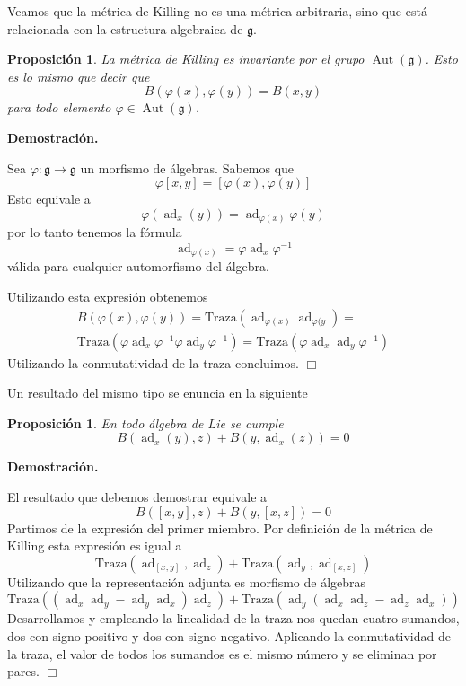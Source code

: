 \documentclass[a4paper,draft,12pt]{article}
\newtheorem{propo}[teo]{Proposición}%
\newcommand{\dem}{\noindent \textbf{Demostración. }\vspace{0.3 cm}}%
\newcommand{\g}{\mathfrak{g}}%
\newcommand{\fin}{ $\Box $ \vspace{0.4 cm}}
\DeclareMathOperator{\Aut}{Aut}%
\DeclareMathOperator{\ad}{ad}  %
\begin{document}
Veamos que la métrica de Killing no es una métrica arbitraria, sino que está relacionada con la estructura algebraica de $\g$.

\begin{propo}

La métrica de Killing  es invariante por el grupo $\Aut(\g)$.  Esto es lo mismo que decir que 
$$
B(\varphi(x),\varphi(y))= B(x,y)
$$
para todo elemento $\varphi \in \Aut(\g)$.

\end{propo}

\dem

Sea $\varphi: \g \rightarrow \g$ un morfismo de álgebras.  Sabemos que 
$$
\varphi[x,y]= [\varphi(x), \varphi(y)]
$$
  Esto equivale a
$$
\varphi(\ad_x(y))= \ad_{\varphi(x)} \varphi (y)
$$
por lo tanto tenemos la fórmula
$$
\ad_{\varphi(x)}= \varphi \ad_x \varphi^{-1}
$$
válida para cualquier automorfismo del álgebra.

Utilizando esta expresión obtenemos
\begin{equation}\nonumber
\begin{split}
B(\varphi(x),\varphi(y))= \mathrm{Traza}(\ad_{\varphi(x)} \ad_{\varphi(y}) =\\ \nonumber
\mathrm{Traza} ( \varphi \ad_x \varphi^{-1}  \varphi \ad_y \varphi^{-1})=  \mathrm{Traza}(\varphi \ad_x  \ad_y \varphi^{-1})
\end{split}
\end{equation}
Utilizando la conmutatividad de la traza concluimos. \fin 

Un resultado del mismo tipo se enuncia en la siguiente 

\begin{propo}

En todo álgebra de Lie se cumple
$$
B(\ad_x(y), z)+ B (y, \ad_x(z))=0
$$

\end{propo}

\dem

El resultado que debemos demostrar equivale a 
$$
B([x,y],z)+B(y,[x,z])=0
$$
Partimos de la expresión del primer miembro.  Por definición de la métrica de Killing esta expresión es igual a 
$$
\mathrm{Traza}(\ad_{[x,y]},\ad_z) + \mathrm{Traza}(\ad_y, \ad_{[x,z]})
$$
Utilizando que la representación adjunta es morfismo de álgebras
$$
\mathrm{Traza}((\ad_x \ad_y-\ad_y\ad_x)\ad_z)+ \mathrm{Traza}(\ad_y(\ad_x\ad_z-\ad_z\ad_x))
$$
Desarrollamos y empleando la linealidad de la traza nos quedan cuatro sumandos, dos con signo positivo y dos con signo negativo.  Aplicando la conmutatividad de la traza, el valor de todos los sumandos es el mismo número y se eliminan por pares. \fin
\end{document}
